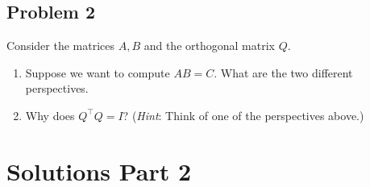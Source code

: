 \documentclass[11pt]{article}
\begin{document}
\subsection*{Problem 2}
Consider the matrices $A,B$ and the orthogonal matrix $Q$.
\begin{enumerate}
    \item[(a)] Suppose we want to compute $AB=C$. What are the two different perspectives.
    \item[(b)] Why does $Q^\top Q = I$? (\textit{Hint}: Think of one of the perspectives above.)
\end{enumerate}

\clearpage

\section*{Solutions Part 2}
\end{document}
